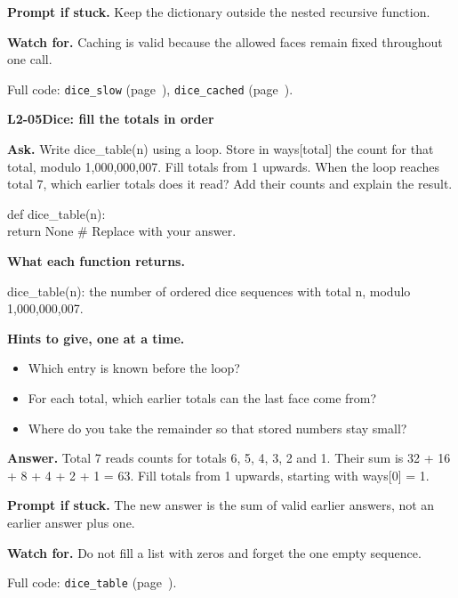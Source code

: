 \documentclass[11pt,a4paper]{article}
\begin{document}
\begin{minipage}{\textwidth}
\textbf{Prompt if stuck.} Keep the dictionary outside the nested recursive function.\par\smallskip
\textbf{Watch for.} Caching is valid because the allowed faces remain fixed throughout one call.\par\smallskip Full code: \texttt{dice\_slow} (page~\pageref{L2-code-dice_slow}), \texttt{dice\_cached} (page~\pageref{L2-code-dice_cached}).
\end{minipage}\par{}\medskip

\noindent\begin{minipage}{\textwidth}
{\color{teal}\textbf{L2-05}}\quad \textbf{Dice: fill the totals in order}\par\smallskip
\textbf{Ask.} Write dice\_table(n) using a loop. Store in ways[total] the count for that total, modulo 1,000,000,007. Fill totals from 1 upwards. When the loop reaches total 7, which earlier totals does it read? Add their counts and explain the result.\par\smallskip
\par{}\par\smallskip\noindent\colorbox{codepaper}{\parbox{\dimexpr\linewidth-2\fboxsep\relax}{\small\ttfamily\raggedright def dice\_table(n):\\\hspace*{2.4em}return None  \# Replace with your answer.}}\par
{\small\textbf{What each function returns.}\par dice\_table(n): the number of ordered dice sequences with total n, modulo 1,000,000,007.\par }
{\small\textbf{Hints to give, one at a time.}}\begin{itemize}\item Which entry is known before the loop?\item For each total, which earlier totals can the last face come from?\item Where do you take the remainder so that stored numbers stay small?\end{itemize}
\textbf{Answer.} Total 7 reads counts for totals 6, 5, 4, 3, 2 and 1. Their sum is 32 + 16 + 8 + 4 + 2 + 1 = 63. Fill totals from 1 upwards, starting with ways[0] = 1.\par\smallskip
\textbf{Prompt if stuck.} The new answer is the sum of valid earlier answers, not an earlier answer plus one.\par\smallskip
\textbf{Watch for.} Do not fill a list with zeros and forget the one empty sequence.\par\smallskip Full code: \texttt{dice\_table} (page~\pageref{L2-code-dice_table}).
\end{minipage}\par{}\medskip
\end{document}
